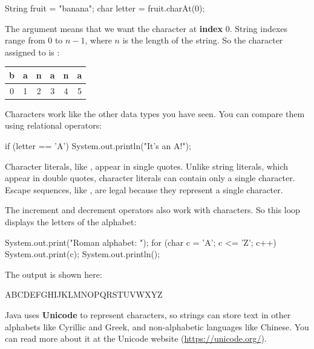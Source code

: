 \begin{code}
String fruit = "banana";
char letter = fruit.charAt(0);
\end{code}

The argument  means that we want the character at {\bf index} 0.
String indexes range from 0 to $n-1$, where $n$ is the length of the string.
So the character assigned to  is :

\begin{center}
\ttfamily
\begin{tabular}{cccccc}
\hline
\multicolumn{1}{|l|}{b} & \multicolumn{1}{l|}{a} & \multicolumn{1}{l|}{n} & \multicolumn{1}{l|}{a} & \multicolumn{1}{l|}{n} & \multicolumn{1}{l|}{a} \\ \hline
0                       & 1                      & 2                      & 3                      & 4                      & 5
\end{tabular}
\end{center}

Characters work like the other data types you have seen.
You can compare them using relational operators:

\begin{code}
if (letter == 'A') {
    System.out.println("It's an A!");
}
\end{code}


Character literals, like , appear in single quotes.
Unlike string literals, which appear in double quotes, character literals can contain only a single character.
Escape sequences, like , are legal because they represent a single character.

The increment and decrement operators also work with characters.
So this loop displays the letters of the alphabet:

\begin{code}
System.out.print("Roman alphabet: ");
for (char c = 'A'; c <= 'Z'; c++) {
    System.out.print(c);
}
System.out.println();
\end{code}

The output is shown here:

\begin{stdout}
ABCDEFGHIJKLMNOPQRSTUVWXYZ
\end{stdout}


Java uses {\bf Unicode} to represent characters, so strings can store text in other alphabets like Cyrillic and Greek, and non-alphabetic languages like Chinese.
You can read more about it at the Unicode website (\url{https://unicode.org/}).

